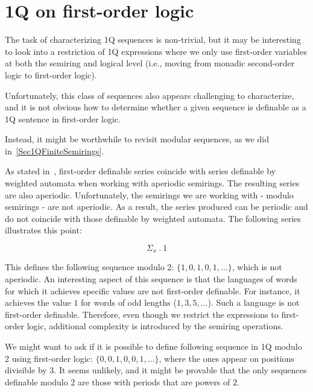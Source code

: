 \documentclass[en]{pracamgr}
\theoremstyle{definition}
\begin{document}
\section{1Q on first-order logic}
The task of characterizing 1Q sequences is non-trivial, but it may be interesting to look into a restriction of 1Q expressions where we only use first-order variables at both the semiring and logical level (i.e., moving from monadic second-order logic to first-order logic).

Unfortunately, this class of sequences also appears challenging to characterize, and it is not obvious how to determine whether a given sequence is definable as a 1Q sentence in first-order logic.

Instead, it might be worthwhile to revisit modular sequences, as we did in~\cref{Sec1QFiniteSemirings}.

As stated in~\cite{DrosteG07}, first-order definable series coincide with series definable by weighted automata when working with aperiodic semirings. The resulting series are also aperiodic. Unfortunately, the semirings we are working with - modulo semirings - are not aperiodic. As a result, the series produced can be periodic and do not coincide with those definable by weighted automata. The following series illustrates this point:

$$ \Sigma_x \ . \ 1 $$

This defines the following sequence modulo 2: $\{1, 0, 1, 0, 1, \ldots\}$, which is not aperiodic. An interesting aspect of this sequence is that the languages of words for which it achieves specific values are not first-order definable. For instance, it achieves the value $1$ for words of odd lengths ($1, 3, 5, \ldots$). Such a language is not first-order definable. Therefore, even though we restrict the expressions to first-order logic, additional complexity is introduced by the semiring operations.

We might want to ask if it is possible to define following sequence in 1Q modulo $2$ using first-order logic: $\{0, 0, 1, 0, 0, 1, \ldots\}$, where the ones appear on positions divisible by 3. It seems unlikely, and it might be provable that the only sequences definable modulo 2 are those with periods that are powers of $2$.



\end{document}

